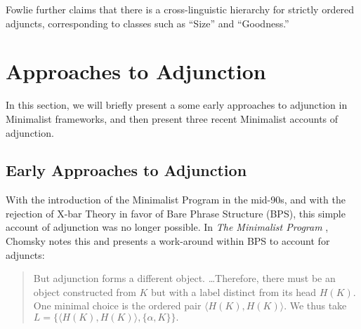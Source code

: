 \documentclass{article}
\begin{document}
Fowlie further claims that there is a cross-linguistic hierarchy for
strictly ordered adjuncts, corresponding to classes such as ``Size''
and ``Goodness.''


\section{Approaches to Adjunction}
\label{sec:approaches}

In this section, we will briefly present a some early approaches to
adjunction in Minimalist frameworks, and then present three recent
Minimalist accounts of adjunction.


\subsection{Early Approaches to Adjunction}
\label{sec:early-approaches}


With the introduction of the Minimalist Program in the mid-90s, and
with the rejection of X-bar Theory in favor of Bare Phrase Structure
(BPS), this simple account of adjunction was no longer possible.  In
\textit{The Minimalist Program} \cite{chomsky1995}, Chomsky notes this
and presents a work-around within BPS to account for adjuncts:

\begin{quotation}
  \noindent
  But adjunction forms a different object.  \dots Therefore, there
  must be an object constructed from $K$ but with a label distinct
  from its head $H(K)$.  One minimal choice is the ordered pair
  $\langle H(K), H(K) \rangle$.  We thus take $L = \{ \langle H(K),
  H(K) \rangle, \{ \alpha, K \} \}.$
\end{quotation}
\end{document}
